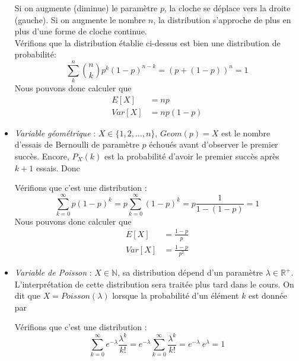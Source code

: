 \documentclass[a4paper,12pt]{report}
\theoremstyle{definition}
\newcommand{\R}{\mathbb{R}}
\newcommand{\N}{\mathbb{N}}
\renewcommand{\(}{\left(}
\renewcommand{\)}{\right)}
\renewcommand{\P}{\mathcal{P}}
\renewcommand{\d}{\textit}
\begin{document}
\begin{itemize}[label = \textbullet]
                Si on augmente (diminue) le paramètre $p$, la cloche se déplace vers la droite (gauche). Si on augmente le nombre $n$, la distribution s'approche de plus en plus d'une forme de cloche continue.\\
                
                Vérifions que la distribution établie ci-dessus est bien une distribution de probabilité:
                $$\sum_k^n {n\choose k} p^k(1-p)^{n-k} = (p+(1-p))^n = 1$$
                Nous pouvons donc calculer que
                \begin{align*}
                    E[X] &= np \\
                    Var[X] &= np(1-p)
                \end{align*}
                \item \d{Variable géométrique} : $X\in\{ 1,2,\dots,n \}$, $Geom(p) = X$ est le nombre d'essais de Bernoulli de paramètre $p$ échoués avant d'observer le premier succès. Encore, $P_X(k)$ est la probabilité d'avoir le premier succès après $k+1$ essais. Donc
                \begin{center}
                    \setlength{\fboxrule}{1pt}
                    \fbox{$\P_X(k) = p(1-p)^k$}
                \end{center}
                Vérifions que c'est une distribution :
                $$\sum_{k=0}^\infty p(1-p)^k = p\sum_{k=0}^\infty (1-p)^k = p\frac{1}{1-(1-p)} = 1$$
                Nous pouvons donc calculer que
                \begin{align*}
                    E[X] &= \frac{1-p}{p} \\
                    Var[X] &= \frac{1-p}{p^2}
                \end{align*}
                \item \d{Variable de Poisson} : $X\in\N$, sa distribution dépend d'un paramètre $\lambda\in\R^+$. L'interprétation de cette distribution sera traitée plus tard dans le cours. On dit que  $X=Poisson(\lambda)$ lorsque la probabilité d'un élément $k$ est donnée par
                \begin{center}
                    \setlength{\fboxrule}{1pt}
                    \fbox{$\displaystyle{\P_X(k) = e^{-\lambda}\frac{\lambda^k}{k!}}$}
                \end{center}
                Vérifions que c'est une distribution :
                $$\sum_{k=0}^\infty e^{-\lambda}\frac{\lambda^k}{k!} = e^{-\lambda}\sum_{k=0}^\infty \frac{\lambda^k}{k!} = e^{-\lambda}~e^{\lambda} = 1$$

\end{itemize}
\end{document}
